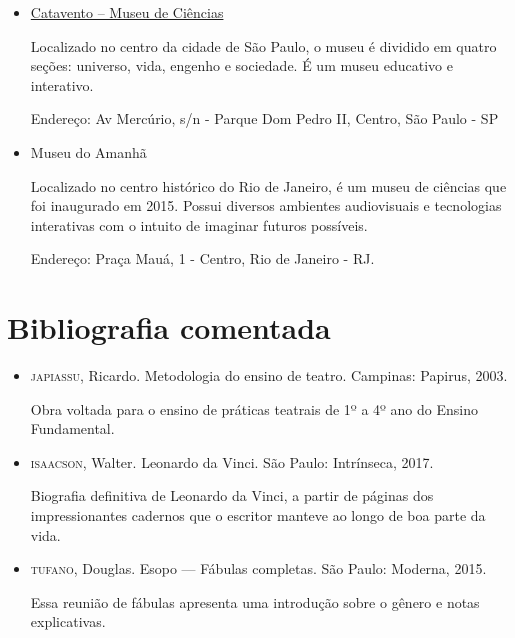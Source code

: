 \documentclass[11pt]{extarticle}
\begin{document}
\begin{itemize}

\item \href{https://museucatavento.org.br/}{Catavento – Museu de Ciências}

Localizado no centro da cidade de São Paulo, o museu é dividido em quatro seções: universo, vida, engenho e sociedade. É um museu educativo e interativo.

Endereço: Av Mercúrio, s/n - Parque Dom Pedro II, Centro, São Paulo - SP

\item {Museu do Amanhã}

Localizado no centro histórico do Rio de Janeiro, é um museu de ciências que foi inaugurado em 2015. Possui diversos ambientes audiovisuais e tecnologias interativas com o intuito de imaginar futuros possíveis.

Endereço: Praça Mauá, 1 - Centro, Rio de Janeiro - RJ.

\end{itemize}

\section{Bibliografia comentada}

\begin{itemize}

\item \textsc{japiassu}, Ricardo. Metodologia do ensino de teatro. Campinas: Papirus, 2003.

Obra voltada para o ensino de práticas teatrais de 1º a 4º ano do Ensino Fundamental.

\item \textsc{isaacson}, Walter. Leonardo da Vinci. São Paulo: Intrínseca, 2017.

Biografia definitiva de Leonardo da Vinci, a partir de páginas dos impressionantes cadernos que o escritor manteve ao longo de boa parte da vida.

\item \textsc{tufano}, Douglas. Esopo --- Fábulas completas. São Paulo: Moderna, 2015.
 
Essa reunião de fábulas apresenta uma introdução sobre o gênero e notas explicativas.

\end{itemize}
\end{document}
